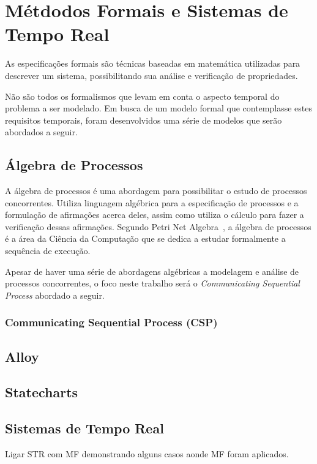 \section{Métdodos Formais e Sistemas de Tempo Real}
\label{sec:MFeSTR}
As especificações formais são técnicas baseadas em matemática utilizadas para descrever um sistema,
possibilitando sua análise e verificação de propriedades.

Não são todos os formalismos que levam em conta o aspecto temporal do problema a ser modelado.
Em busca de um modelo formal que contemplasse estes requisitos temporais, foram desenvolvidos uma série
de modelos que serão abordados a seguir.

\subsection{Álgebra de Processos}
A álgebra de processos é uma abordagem para possibilitar o estudo de processos concorrentes. Utiliza linguagem algébrica
para a especificação de processos e a formulação de afirmações acerca deles, assim como utiliza o cálculo para fazer a
verificação dessas afirmações. Segundo Petri Net Algebra~\cite{books/daglib/0003970}, a álgebra de processos é a área da
Ciência da Computação que se dedica a estudar formalmente a sequência de execução.

Apesar de haver uma série de abordagens algébricas a modelagem e análise de processos concorrentes, o foco neste trabalho
será o \textit{Communicating Sequential Process} abordado a seguir.

\subsubsection{Communicating Sequential Process (CSP)}


\subsection{Alloy}


\subsection{Statecharts}


\subsection{Sistemas de Tempo Real}
Ligar STR com MF demonstrando alguns casos aonde MF foram aplicados.
